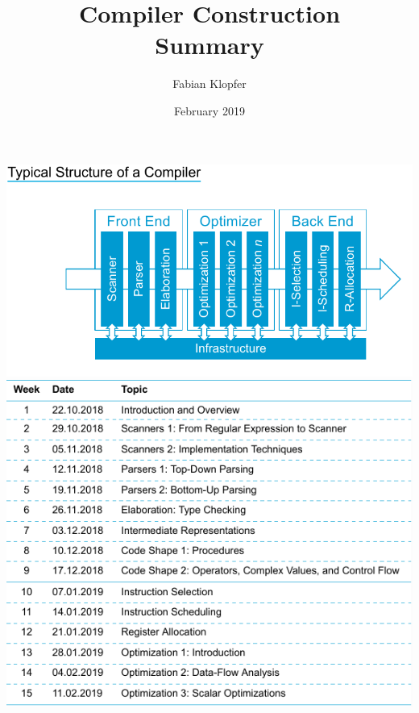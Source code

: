 \documentclass[a4paper]{report}
\title{Compiler Construction \\
Summary}
\author{Fabian Klopfer}
\date{February 2019}
\begin{document}
\begin{onecolumn}
\begin{center}
    \includegraphics[width=.8\textwidth,height=0.4\textheight,keepaspectratio]{img/architecture_overview.png} \\
    \includegraphics[width=.8\textwidth,height=0.4\textheight,keepaspectratio]{img/topic_overview.png}\\
\end{center}
\end{onecolumn}

\tableofcontents
\newpage

\begin{twocolumn}



\end{twocolumn}
\end{document}
